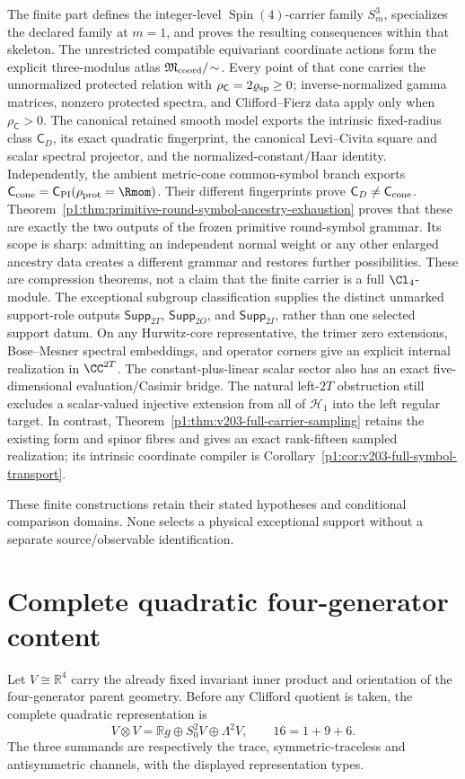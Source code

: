 \documentclass[11pt]{article}
\begin{document}
The finite part defines the integer-level \(\operatorname{Spin}(4)\)-carrier family
\(S^3_m\), specializes the declared family at \(m=1\), and proves the
resulting consequences within that skeleton.  The unrestricted compatible
equivariant coordinate actions form the explicit three-modulus atlas
\(\mathfrak M_{\rm coord}/\!\sim\).  Every point of that cone carries the
unnormalized protected relation with
\(\rho_{\mathsf C}=2\varrho_{\rm sp}\ge0\); inverse-normalized gamma matrices,
nonzero protected spectra, and Clifford--Fierz data apply only when
\(\rho_{\mathsf C}>0\).  The canonical retained smooth model
exports the intrinsic fixed-radius class \(\mathsf C_D\), its exact quadratic
fingerprint, the canonical Levi--Civita square and scalar spectral projector,
and the normalized-constant/Haar identity.  Independently, the ambient
metric-cone common-symbol branch exports
\(\mathsf C_{\rm cone}=\mathsf C_{\rm PI}(\rho_{\rm prot}=\Rmom)\).
Their different fingerprints prove
\(\mathsf C_D\ne\mathsf C_{\rm cone}\).
Theorem~\ref{p1:thm:primitive-round-symbol-ancestry-exhaustion} proves that
these are exactly the two outputs of the frozen primitive round-symbol
grammar.  Its scope is sharp: admitting an independent normal weight or any
other enlarged ancestry data creates a different grammar and restores further
possibilities.  These are compression theorems, not a claim that the finite
carrier is a full \(\Cl_4\)-module.  The exceptional
subgroup classification supplies the distinct unmarked support-role outputs
\(\mathsf{Supp}_{2T}\), \(\mathsf{Supp}_{2O}\), and
\(\mathsf{Supp}_{2I}\), rather than one selected support datum.
On any Hurwitz-core representative, the trimer zero extensions,
Bose--Mesner spectral embeddings, and operator corners give an explicit
internal realization in \(\CC^{2T}\).  The constant-plus-linear scalar sector
also has an exact five-dimensional evaluation/Casimir bridge. The natural
left-\(2T\) obstruction still excludes a scalar-valued injective extension
from all of \(\mathcal H_1\) into the left regular target. In contrast,
Theorem~\ref{p1:thm:v203-full-carrier-sampling} retains the existing form and
spinor fibres and gives an exact rank-fifteen sampled realization; its
intrinsic coordinate compiler is Corollary~\ref{p1:cor:v203-full-symbol-transport}.

These finite constructions retain their stated hypotheses and
conditional comparison domains.  None selects a physical exceptional support
without a separate source/observable identification.

\section{Complete quadratic four-generator content}
\label{p1:sec:v189-complete-quadratic-content}
Let $V\cong\mathbb R^4$ carry the already fixed invariant inner product and
orientation of the four-generator parent geometry.  Before any Clifford
quotient is taken, the complete quadratic representation is
\[
 \boxed{V\otimes V=\mathbb R g\oplus S^2_0V\oplus\Lambda^2V,}
 \qquad 16=1+9+6.
\]
The three summands are respectively the trace, symmetric-traceless and
antisymmetric channels, with the displayed representation types.
\end{document}

